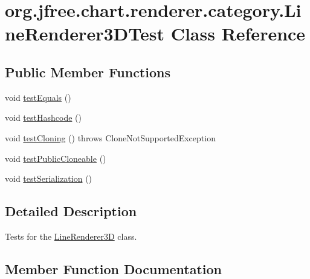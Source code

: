 \hypertarget{classorg_1_1jfree_1_1chart_1_1renderer_1_1category_1_1_line_renderer3_d_test}{}\section{org.\+jfree.\+chart.\+renderer.\+category.\+Line\+Renderer3\+D\+Test Class Reference}
\label{classorg_1_1jfree_1_1chart_1_1renderer_1_1category_1_1_line_renderer3_d_test}
\subsection*{Public Member Functions}
\begin{DoxyCompactItemize}
\item 
void \mbox{\hyperlink{classorg_1_1jfree_1_1chart_1_1renderer_1_1category_1_1_line_renderer3_d_test_ac7f5abdd69fc3c98b7d3fccfab2a2bfe}{test\+Equals}} ()
\item 
void \mbox{\hyperlink{classorg_1_1jfree_1_1chart_1_1renderer_1_1category_1_1_line_renderer3_d_test_ac965c7ccca4e1b3cdcefb37b0f031594}{test\+Hashcode}} ()
\item 
void \mbox{\hyperlink{classorg_1_1jfree_1_1chart_1_1renderer_1_1category_1_1_line_renderer3_d_test_ae2db4c787eac346398964ed4dc147c6a}{test\+Cloning}} ()  throws Clone\+Not\+Supported\+Exception 
\item 
void \mbox{\hyperlink{classorg_1_1jfree_1_1chart_1_1renderer_1_1category_1_1_line_renderer3_d_test_a33a4a6ac789ae893db63d1c090d783e5}{test\+Public\+Cloneable}} ()
\item 
void \mbox{\hyperlink{classorg_1_1jfree_1_1chart_1_1renderer_1_1category_1_1_line_renderer3_d_test_a804fffef12308f0e1c356c72303b7b21}{test\+Serialization}} ()
\end{DoxyCompactItemize}


\subsection{Detailed Description}
Tests for the \mbox{\hyperlink{classorg_1_1jfree_1_1chart_1_1renderer_1_1category_1_1_line_renderer3_d}{Line\+Renderer3D}} class. 

\subsection{Member Function Documentation}
\mbox{\label{classorg_1_1jfree_1_1chart_1_1renderer_1_1category_1_1_line_renderer3_d_test_ae2db4c787eac346398964ed4dc147c6a}} 
